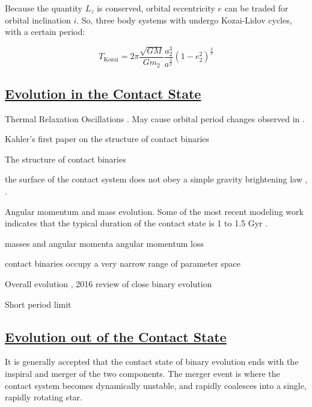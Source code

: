 \documentclass[12pt]{article} %
\numberwithin{equation}{section} %
\begin{document}
Because the quantity $L_{z}$ is conserved, orbital eccentricity $e$ can be traded for orbital inclination $i$. So, three body systems with undergo Kozai-Lidov cycles, with a certain period:

\begin{equation} \label{kozai_2}
T_{\text{Kozai}} = 2 \pi \frac{\sqrt{GM}}{G m_{2}} \frac{a_{2}^{3}}{a^{\frac{3}{2}}} (1 - e^{2}_{2})^{\frac{3}{2}}
\end{equation}


\subsection[Evolution in the Contact State]{\hyperlink{toc}{Evolution in the Contact State}}

Thermal Relaxation Oscillations \citep{wang1994thermal}. May cause orbital period changes observed in \citet{qian2001orbital}.

Kahler's first paper on the structure of contact binaries \citep{kahler2002structure}

The structure of contact binaries \citep{kahler2004structure}

the surface of the contact system does not obey a simple gravity brightening law \citep{kahler2004structure}, \citep{hilditch1988evolutionary}.

\citep{rubenstein2001effect}

Angular momentum and mass evolution. Some of the most recent modeling work indicates that the typical duration of the contact state is 1 to 1.5 Gyr \citep{gazeas2008angular}.

masses and angular momenta \citep{gazeas2006masses} angular momentum loss \citep{vilhu1981contact}

contact binaries occupy a very narrow range of parameter space \citep{gazeas2009physical} \citep{awadalla2005absolute}

Overall evolution \citep{stepien2008evolutionary}, 2016 review of close binary evolution \citep{tutukov2016evolution}

Short period limit \citep{rucinski2007short} \citep{drake2014ultra} \cite{lohr2012period} \citep{rucinski1992can}


\subsection[Evolution out of the Contact State]{\hyperlink{toc}{Evolution out of the Contact State}}

It is generally accepted that the contact state of binary evolution ends with the inspiral and merger of the two components. The merger event is where the contact system becomes dynamically unstable, and rapidly coalesces into a single, rapidly rotating star. 
\end{document}
